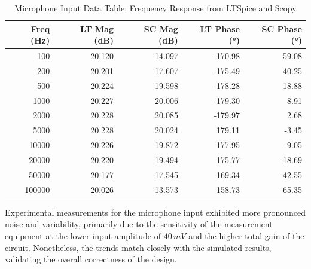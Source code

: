 \documentclass[12pt]{article}
\begin{document}
\begin{table}[H]
	\centering
	\footnotesize
	\caption{Microphone Input Data Table: Frequency Response from LTSpice and Scopy}
	\label{tab:mic_data}
	\renewcommand{\arraystretch}{1.0}
	\begin{tabular}{|r|r|r|r|r|}
		\hline
		\textbf{Freq (Hz)} & \textbf{LT Mag (dB)} & \textbf{SC Mag (dB)} & \textbf{LT Phase (°)} & \textbf{SC Phase (°)} \\ \hline
		100                & 20.120               & 14.097               & -170.98               & 59.08                 \\ \hline
		200                & 20.201               & 17.607               & -175.49               & 40.25                 \\ \hline
		500                & 20.224               & 19.598               & -178.28               & 18.88                 \\ \hline
		1000               & 20.227               & 20.006               & -179.30               & 8.91                  \\ \hline
		2000               & 20.228               & 20.085               & -179.97               & 2.68                  \\ \hline
		5000               & 20.228               & 20.024               & 179.11                & -3.45                 \\ \hline
		10000              & 20.226               & 19.872               & 177.95                & -9.05                 \\ \hline
		20000              & 20.220               & 19.494               & 175.77                & -18.69                \\ \hline
		50000              & 20.177               & 17.545               & 169.34                & -42.55                \\ \hline
		100000             & 20.026               & 13.573               & 158.73                & -65.35                \\ \hline
	\end{tabular}
\end{table}
Experimental measurements for the microphone input exhibited more pronounced noise and variability, primarily due to the sensitivity of the measurement equipment at the lower input amplitude of $40\,mV$ and the higher total gain of the circuit. Nonetheless, the trends match closely with the simulated results, validating the overall correctness of the design.
\end{document}
